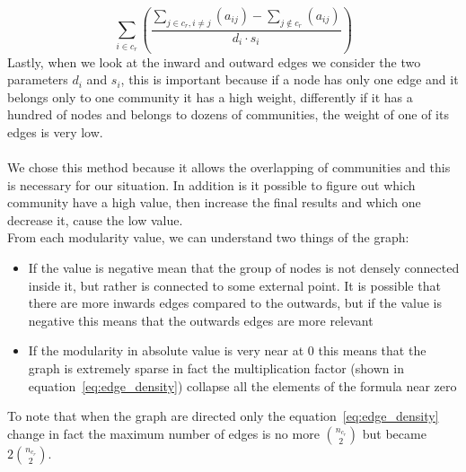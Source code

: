 \begin{equation}
	\sum\limits_{i \in c_r} \left( \frac{
		\sum\limits_{j \in c_r, i \neq j} \left( a_{ij} \right) - 
		\sum\limits_{j \notin c_r} \left( a_{ij} \right) 
	} {d_i \cdot s_i} \right)
	\label{eq:in-out_edge_relation}
\end{equation}
Lastly, when we look at the inward and outward edges we consider the two parameters $d_i$ and $s_i$, this is important because if a node has only one edge and it belongs only to one community it has a high weight, differently if it has a hundred of nodes and belongs to dozens of communities, the weight of one of its edges is very low.\\
\\
We chose this method because it allows the overlapping of communities and this is necessary for our situation. In addition is it possible to figure out which community have a high value, then increase the final results and which one decrease it, cause the low value.\\
From each modularity value, we can understand two things of the graph:
\begin{itemize}
	\item If the value is negative mean that the group of nodes is not densely connected inside it, but rather is connected to some external point. It is possible that there are more inwards edges compared to the outwards, but if the value is negative this means that the outwards edges are more relevant
	\item If the modularity in absolute value is very near at 0 this means that the graph is extremely sparse in fact the multiplication factor (shown in equation~\ref{eq:edge_density}) collapse all the elements of the formula near zero
\end{itemize}
\noindent To note that when the graph are directed only the equation~\ref{eq:edge_density} change in fact the maximum number of edges is no more $ \displaystyle\binom{n_{c_r}}{2}$ but became $\displaystyle 2\binom{n_{c_r}}{2}$.
%
%
